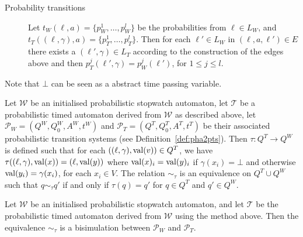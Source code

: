 \begin{description}
\item[Probability transitions] Let $t_{W}(\ell,a) = \{p_{W}^{1},\ldots,p_{W}^{l}\}$ be the probabilities from $\ell\in L_{W}$, and $t_{T}((\ell,\gamma),a) = \{p_{T}^{1},\ldots,p_{T}^{l}\}$.
Then for each $\ell'\in L_{W}$ in $(\ell,a,\ell')\in E$ there exists a $(\ell',\gamma)\in L_{T}$ according to the construction of the edges above and then $p_{T}^{j}(\ell',\gamma) = p_{W}^{j}(\ell')$, for $1\leq j \leq l$.
\end{description}

Note that $\bot$ can be seen as a abstract time passing variable.

\begin{defi}
Let $\mathcal{W}$ be an initialised probabilistic stopwatch automaton, let $\mathcal{T}$ be a probabilistic timed automaton derived from $\mathcal{W}$ as described above, let
$\mathcal{P}_{W}=(Q^{W},Q^{W}_{0},A^{W},t^{W})$ and $\mathcal{P}_{T}=(Q^{T},Q^{T}_{0},A^{T},t^{T})$ be their associated probabilistic transition systems (see Definition~\ref{def:pha2pts}). Then
$\tau : Q^{T}\rightarrow Q^{W}$ is defined such that for each $((\ell,\gamma),\operatorname{val}(v))\in Q^{T}$, we have $\tau((\ell,\gamma),\operatorname{val}(x))=(\ell,\operatorname{val}(y))$ where $\operatorname{val}(x)_{i}=\operatorname{val}(y)_{i}$ if
$\gamma(x_{i})=\bot$ and otherwise $\operatorname{val}(y_{i})=\gamma(x_{i})$, for each $x_{i}\in V$. The relation $\sim_{\tau}$ is an equivalence on $Q^{T}\cup Q^{W}$ such that $q\sim_{\tau}q'$ if and only if  $\tau(q)=q'$ for $q\in Q^{T}$ and $q'\in Q^{W}$.
\end{defi}

\begin{prop}
Let $\mathcal{W}$ be an initialised probabilistic stopwatch automaton, and let $\mathcal{T}$ be the probabilistic timed automaton derived from $\mathcal{W}$ using the method above. Then the equivalence $\sim_{\tau}$ is a bisimulation between $\mathcal{P}_{W}$ and $\mathcal{P}_{T}$.
\end{prop}


